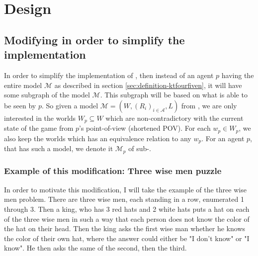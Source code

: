 \section{Design}

\newcommand{\POVModel}{\mathcal{M}}


\subsection{Modifying \KTfourfiveN in order to simplify the implementation}
In order to simplify the implementation of \KTfourfiveN, then instead of an agent $p$ having the entire model $\mathcal{M}$ as described in section \ref{sec:definition-ktfourfiven}, it will have some subgraph of the model $\mathcal{M}$. This subgraph will be based on what is able to be seen by $p$. So given a model $\mathcal{M} = (W,(R_i)_{i\in \mathcal{A}},L)$ from \KTfourfiveN, we are only interested in the worlds $W_{p} \subseteq W$ which are non-contradictory with the current state of the game from $p$'s point-of-view (shortened POV). For each $w_p \in W_{p}$, we also keep the worlds which has an equivalence relation to any $w_p$.
For an agent $p$, that has such a model, we denote it $\mathcal{M}_p$ of sub-\KTfourfiveN.

\subsubsection{Example of this modification: Three wise men puzzle}\label{sec:motivation}
In order to motivate this modification, I will take the example of the three wise men problem.
There are three wise men, each standing in a row, enumerated 1 through 3. 
Then a king, who has 3 red hats and 2 white hats puts a hat on each of the three wise men in such a way that each person does not know the color of the hat on their head. 
Then the king asks the first wise man whether he knows the color of their own hat, where the answer could either be "I don't know" or "I know". 
He then asks the same of the second, then the third.


